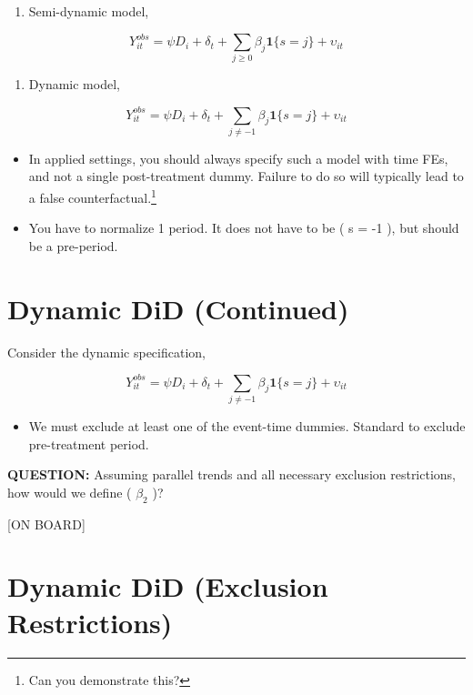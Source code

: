 \documentclass[
  letterpaper,
  DIV=11,
  numbers=noendperiod]{scrreprt}
\providecommand{\tightlist}{%
  \setlength{\itemsep}{0pt}\setlength{\parskip}{0pt}}\usepackage{longtable,booktabs,array}
\theoremstyle{definition}
\theoremstyle{remark}
\begin{document}
\begin{enumerate}
\def\labelenumi{\arabic{enumi}.}
\tightlist
\item
  Semi-dynamic model,
\end{enumerate}

\[
Y^{obs}_{it} = \psi D_i + \delta_t + \sum_{j \geq 0} \beta_j \mathbf{1}\{s = j\} + \upsilon_{it}
\]

\begin{enumerate}
\def\labelenumi{\arabic{enumi}.}
\setcounter{enumi}{1}
\tightlist
\item
  Dynamic model,
\end{enumerate}

\[
Y^{obs}_{it} = \psi D_i + \delta_t + \sum_{j \neq -1} \beta_j \mathbf{1}\{s = j\} + \upsilon_{it}
\]

\begin{itemize}
\tightlist
\item
  In applied settings, you should always specify such a model with time
  FEs, and not a single post-treatment dummy. Failure to do so will
  typically lead to a false counterfactual.\footnote{Can you demonstrate
    this?}
\item
  You have to normalize 1 period. It does not have to be ( s = -1 ), but
  should be a pre-period.
\end{itemize}

\hypertarget{dynamic-did-continued}{%
\section{Dynamic DiD (Continued)}\label{dynamic-did-continued}}

Consider the dynamic specification,

\[
Y^{obs}_{it} = \psi D_i + \delta_t + \sum_{j \neq -1} \beta_j \mathbf{1}\{s = j\} + \upsilon_{it}
\]

\begin{itemize}
\tightlist
\item
  We must exclude at least one of the event-time dummies. Standard to
  exclude pre-treatment period.
\end{itemize}

\textbf{QUESTION:} Assuming parallel trends and all necessary exclusion
restrictions, how would we define ( \(\beta_2\) )?

{[}ON BOARD{]}

\hypertarget{dynamic-did-exclusion-restrictions}{%
\section{Dynamic DiD (Exclusion
Restrictions)}\label{dynamic-did-exclusion-restrictions}}
\end{document}
